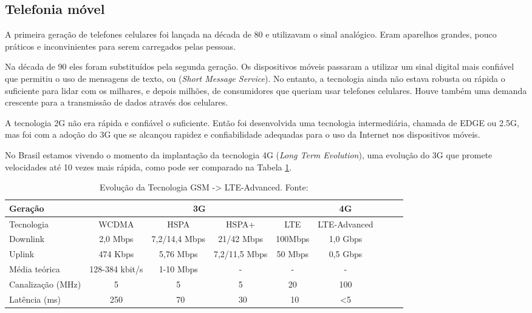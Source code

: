 \subsection{Telefonia móvel}
A primeira geração de telefones celulares foi lançada na década de 80 e utilizavam o sinal analógico. Eram aparelhos grandes, pouco práticos e inconvinientes para serem carregados pelas pessoas.

Na década de 90 eles foram substituídos pela segunda geração. Os dispositivos móveis passaram a utilizar um sinal digital mais confiável que permitiu o uso de mensagens de texto, ou  (\textit{Short Message Service}). No entanto, a tecnologia ainda não estava robusta ou rápida o suficiente para lidar com os milhares, e depois milhões, de consumidores que queriam usar telefones celulares. Houve também uma demanda crescente para a transmissão de dados através dos celulares.

A tecnologia 2G não era rápida e confiável o suficiente. Então foi desenvolvida uma tecnologia intermediária, chamada de EDGE ou 2.5G, mas foi com a adoção do 3G que se alcançou rapidez e confiabilidade adequadas para o uso da Internet nos dispositivos móveis.

No Brasil estamos vivendo o momento da implantação da tecnologia 4G  (\textit{Long Term Evolution}), uma evolução do 3G que promete velocidades até 10 vezes mais rápida, como pode ser comparado na Tabela \ref{tab:LTE}.

\begin{table}[!htb]
	\footnotesize
  	\centering
	\caption[Evolução da Tecnologia GSM -> LTE-Advanced]{Evolução da Tecnologia GSM -> LTE-Advanced. Fonte: \cite{4gamericas}}
	\begin{tabular}{|l|*{8}{c|}}
		\hline \SPACE
		Geração & \multicolumn{4}{|c|}{3G}  & 4G\\ \hline \SPACE
		Tecnologia & WCDMA & HSPA & HSPA+ & LTE & LTE-Advanced\\ \hline \SPACE
		Downlink & 2,0 Mbps & 7,2/14,4 Mbps & 21/42 Mbps & 100Mbps & 1,0 Gbps\\ \hline \SPACE
		Uplink & 474 Kbps & 5,76 Mbps & 7,2/11,5 Mbps & 50 Mbps & 0,5 Gbps\\ \hline \SPACE
		Média teórica & 128-384 kbit/s & 1-10 Mbps & - & - & -\\ \hline \SPACE
		Canalização (MHz) & 5 & 5 & 5 & 20 & 100\\ \hline \SPACE
		Latência (ms) & 250 & ~70 & ~30 & ~10 & <5\\ \hline
	\end{tabular}
	\label{tab:LTE}
\end{table}%

